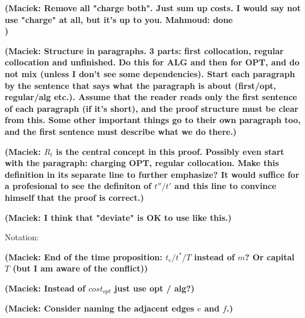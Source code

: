 \documentclass[manuscript,screen=true, review, anonymous]{acmart}
\newcommand\mahmoud[1]{\color{orange}\textbf{Mahmoud: #1}\\\color{black}}
\newcommand\maciek[1]{\color{brown}\textbf{(Maciek: #1)}\color{black}}
\begin{document}
\maciek{Remove all "charge both". Just sum up costs. I would say not use "charge" at all, but it's up to you. \mahmoud{done}}


\maciek{Structure in paragraphs. 3 parts: first collocation, regular collocation and unfinished. Do this for ALG and then for OPT, and do not mix (unless I don't see some dependencies). Start each paragraph by the sentence that says what the paragraph is about (first/opt, regular/alg etc.). Assume that the reader reads only the first sentence of each paragraph (if it's short), and the proof structure must be clear from this. Some other important things go to their own paragraph too, and the first sentence must describe what we do there.}

\maciek{$R_t$ is the central concept in this proof. Possibly even start with the paragraph: charging OPT, regular collocation. Make this definition in its separate line to further emphasize? It would suffice for a profesional to see the definiton of $t''/t'$ and this line to convince himself that the proof is correct.}

\maciek{I think that "deviate" is OK to use like this.}

Notation:

\maciek{End of the time proposition: $t_e / t^* / T$ instead of $m$? Or capital $T$ (but I am aware of the conflict)}

\maciek{Instead of $cost_{opt}$ just use opt / alg?}

\maciek{Consider naming the adjacent edges $e$ and $f$.}
\end{document}
